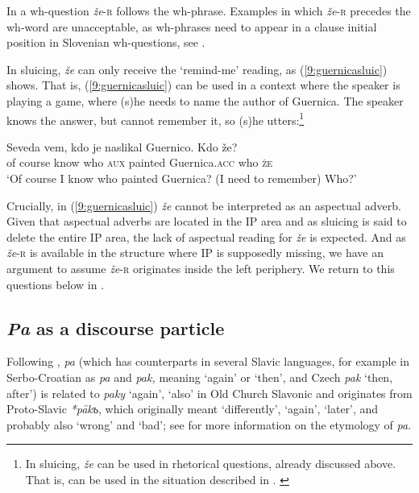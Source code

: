 \documentclass[output=paper,
modfonts,
newtxmath,
hidelinks
]{langscibook}
\begin{document}
\noindent In a wh-question \textit{že}-\textsc{r} follows the wh-phrase. Examples in which \textit{že}-\textsc{r} precedes the wh-word are unacceptable, as wh-phrases need to appear in a clause initial position in Slovenian wh-questions, see \cite{mismas2016benj}. 

\z

\noindent In sluicing, \textit{že} can only receive the `remind-me' reading, as (\ref{9:guernicasluic}) shows. That is, (\ref{9:guernicasluic}) can be used in a context where the speaker is playing a game, where (s)he needs to name the author of Guernica. The speaker knows the answer, but cannot remember it, so (s)he utters:\footnote{In sluicing, \textit{že} can be used in rhetorical questions, already discussed above. That is,  can be used in the situation described in .
\label{9:zakajzefn}
\zlast}

\ea \label{9:guernicasluic}
\gll  Seveda vem, kdo je naslikal Guernico. Kdo že?\\
{of course} know who \textsc{aux} painted Guernica.\textsc{acc} who \textsc{že}\\
\glt `Of course I know who painted Guernica? (I need to remember) Who?'
\z

\noindent Crucially, in (\ref{9:guernicasluic}) \textit{že} cannot be interpreted as an aspectual adverb. Given that aspectual adverbs are located in the IP area and as sluicing is said to delete the entire IP area, the lack of aspectual reading for \textit{že} is expected. And as \textit{že}-\textsc{r} is available in the structure where IP is supposedly missing, we have an argument to assume \textit{že}-\textsc{r} originates inside the left periphery. We return to this questions below in . 


\subsection{\textit{Pa} as a discourse particle}

Following \cite{snoj2009}, \textit{pa} (which has counterparts in several Slavic languages, for example in Serbo-Croatian as \textit{pa} and \textit{pak,} meaning `again' or `then', and Czech \textit{pak} `then, after') is related to \textit{paky} `again', `also' in Old Church Slavonic and originates from Proto-Slavic \textit{*pȃkъ}, which originally meant `differently', `again', `later', and probably also `wrong' and `bad'; see \cite{snoj2009} for more information on the etymology of \textit{pa}.
\end{document}
